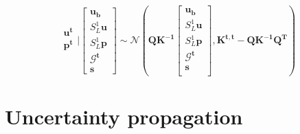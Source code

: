\documentclass[11pt, a4paper]{report}
\begin{document}
\begin{equation}
    \begin{matrix}
      \boldsymbol{u^{t}}\\
      \boldsymbol{p^{t}}\\  
    \end{matrix}
    \bigg|
    \begin{bmatrix}
        \boldsymbol{u_b}\\
        S^1_{L} \boldsymbol{u} \\
        S^1_{L} \boldsymbol{p} \\
        \boldsymbol{\mathcal{G}^{t}} \\
        \boldsymbol{s}
    \end{bmatrix}
    \sim
    \mathcal{N}\left(
        \boldsymbol{Q K^{-1}} \begin{bmatrix} \boldsymbol{u_b} \\ S^1_{L} \boldsymbol{u} \\  S^1_{L} \boldsymbol{p} \\ \boldsymbol{\mathcal{G}^{t}} \\ \boldsymbol{s} \\\end{bmatrix}, 
        \boldsymbol{K^{t, t}} - \boldsymbol{Q K^{-1} Q^T}
    \right)
\end{equation}

\section{Uncertainty propagation}
\label{sec:uncertainty-propagation}
\end{document}
